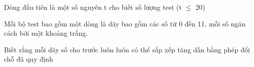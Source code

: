 Dòng đầu tiên là một số nguyên t cho biết số lượng test (t $\le$ 20)  

   Mỗi bộ test bao gồm một dòng là dãy bao gồm các số từ 0 đến 11, mỗi số ngăn cách bởi một khoảng trắng.  

   Biết rằng mỗi dãy số cho trước luôn luôn có thể sắp xếp tăng dần bằng phép đổi chỗ đã quy định  

\
